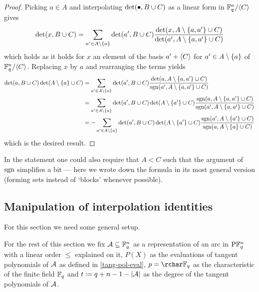 \begin{proof}
  Picking $a\in A$ and interpolating $\det(\bullet,B\cup C)$ as a linear form in
  $\field{q}^n/\gen C$ gives
  $$
  \det(x,B\setjoin C) 
  = \sum_{a'\in A\setminus\set a}{\det(a',B\setjoin C)\frac{\det(x,A\setminus\set{a,a'}\setjoin C)}{\det(a',A\setminus\set{a,a'}\setjoin C)}}
  $$
  which holds as it holds for $x$ an element of the basis $a'+\gen C$ for $a'\in
  A\setminus\set a$ of $\field{q}^n/\gen C$. Replacing $x$ by $a$ and
  rearranging the terms yields
  \begin{align*}
    \det(a,B\setjoin C)\det(A\setminus\set a\setjoin C)
    &= 
    \sum_{a'\in A\setminus\set a}{\det(a',B\setjoin C)\frac{\det(a,A\setminus\set{a,a'}\setjoin C)}{\sgn(a',A\setminus\set{a,a'}\setjoin C)}}\\
    &= 
    \sum_{a'\in A\setminus\set a}{\det(a',B\setjoin C)\det(A\setminus\set {a'}\setjoin C)\frac{\sgn(a,A\setminus\set{a,a'}\setjoin C)}{\sgn(a',A\setminus\set{a,a'}\setjoin C)}}\\
    &= 
    -\sum_{a'\in A\setminus\set a}{\det(a',B\setjoin C)\det(A\setminus\set{a'}\setjoin C)\frac{\sgn(a',A\setminus\set{a'}\setjoin C)}{\sgn(a,A\setminus\set a\setjoin C)}}
  \end{align*}
  which is the desired result.
\end{proof}

\begin{remark}
    In the statement one could also require that $A<C$ such that the argument of $\mathop\mathrm{sgn}$ simplifies a bit --- here we wrote down the formula in its most general version (forming sets instead of `blocks' whenever possible).
\end{remark}

\subsection{Manipulation of interpolation identities}

For this section we need some general setup.

\begin{genassumptions}
For the rest of this section we fix $\mathcal{A}\subseteq\mathbb{F}_{q}^n$ as a representation of an arc in $\P \field{q}^n$ with a linear order $\leq$ explained on it, $P(X)$ as the evaluations of tangent polynomials of $\mathcal{A}$ as defined in \autoref{tang-pol-eval}, $p=\rchar \field{q}$ as the characteristic of the finite field $\mathbb{F}_{q}$ and $t\mathrel{\mathrel{\mathop:}\mkern-1.2mu=} q+n-1-\left\vert{\mathcal{A}}\right\vert$ as the degree of the tangent polynomials of $\mathcal{A}$.  
\end{genassumptions}

